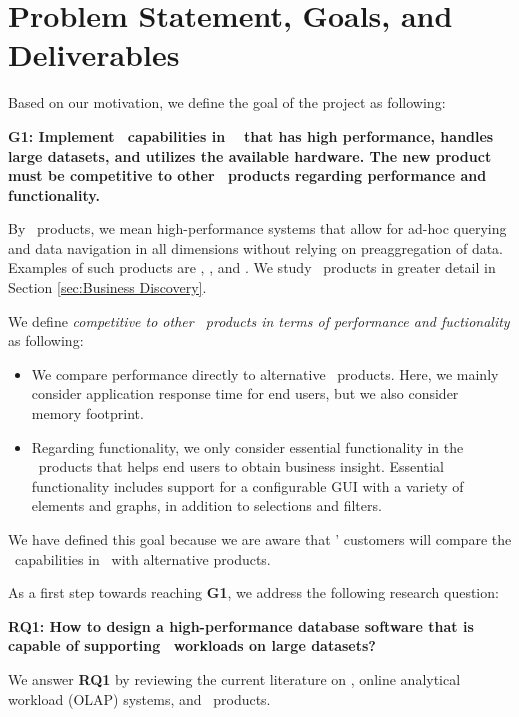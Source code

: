 \section{Problem Statement, Goals, and Deliverables}
\label{sec:problem-statement-and-goals}
Based on our motivation, we define the goal of the project as following: 

\textbf{G1: Implement \bd~capabilities in \genusSoftware~ that has high performance, handles large datasets, and utilizes the available hardware. The new product must be competitive to other \bd~products regarding performance and functionality.}

By \bd~products, we mean high-performance systems that allow for ad-hoc querying and data navigation in all dimensions without relying on preaggregation of data. Examples of such products are \qlikview, \tableau, and \powerpivot. We study \bd~products in greater detail in Section \ref{sec:Business Discovery}.

We define \textit{competitive to other \bd~products in terms of performance and fuctionality} as following:
\begin{itemize}
  \item We compare performance directly to alternative \bd~products. Here, we mainly consider application response time for end users, but we also consider memory footprint.
  \item Regarding functionality, we only consider essential functionality in the \bd~products that helps end users to obtain business insight. Essential functionality includes support for a configurable GUI with a variety of elements and graphs, in addition to selections and filters.
\end{itemize}

We have defined this goal because we are aware that \genus' customers will compare the \bd~capabilities in \genusSoftware~with alternative products. 

As a first step towards reaching \textbf{G1}, we address the following research question:

\textbf{RQ1: How to design a high-performance database software that is capable of supporting \bd~workloads on large datasets?} 

We answer \textbf{RQ1} by reviewing the current literature on \bi, online analytical workload (OLAP) systems, and \bd~products.
